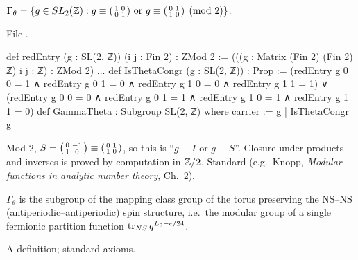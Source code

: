 \begin{definition}\label{l17:def:gammatheta}
$\Gamma_\theta=\{g\in SL_2({\mathbb{Z}}): g\equiv\begin{psmallmatrix}1&0\\0&1\end{psmallmatrix}\text{ or }
g\equiv\begin{psmallmatrix}0&1\\1&0\end{psmallmatrix}\pmod 2\}$.
\end{definition}
\noindent File .
\begin{leancode}
def redEntry (g : SL(2, ℤ)) (i j : Fin 2) : ZMod 2 :=
  (((g : Matrix (Fin 2) (Fin 2) ℤ) i j : ℤ) : ZMod 2)
...
def IsThetaCongr (g : SL(2, ℤ)) : Prop :=
  (redEntry g 0 0 = 1 ∧ redEntry g 0 1 = 0 ∧ redEntry g 1 0 = 0 ∧ redEntry g 1 1 = 1) ∨
    (redEntry g 0 0 = 0 ∧ redEntry g 0 1 = 1 ∧ redEntry g 1 0 = 1 ∧ redEntry g 1 1 = 0)
def GammaTheta : Subgroup SL(2, ℤ) where
  carrier := {g | IsThetaCongr g}
\end{leancode}
\begin{dictionary}
Mod $2$, $S=\begin{psmallmatrix}0&-1\\1&0\end{psmallmatrix}\equiv\begin{psmallmatrix}0&1\\1&0\end{psmallmatrix}$,
so this is ``$g\equiv I$ or $g\equiv S$''. Closure under products and inverses is proved by computation
in ${\mathbb{Z}}/2$. Standard (e.g.\ Knopp, \emph{Modular functions in analytic number theory}, Ch.~2).
\end{dictionary}
\begin{physics}
$\Gamma_\theta$ is the subgroup of the mapping class group of the torus preserving the NS--NS
(antiperiodic--antiperiodic) spin structure, i.e.\ the modular group of a single fermionic partition
function $\operatorname{tr}_{NS}q^{L_0-c/24}$.
\end{physics}
\begin{status}
A definition; standard axioms.
\end{status}

